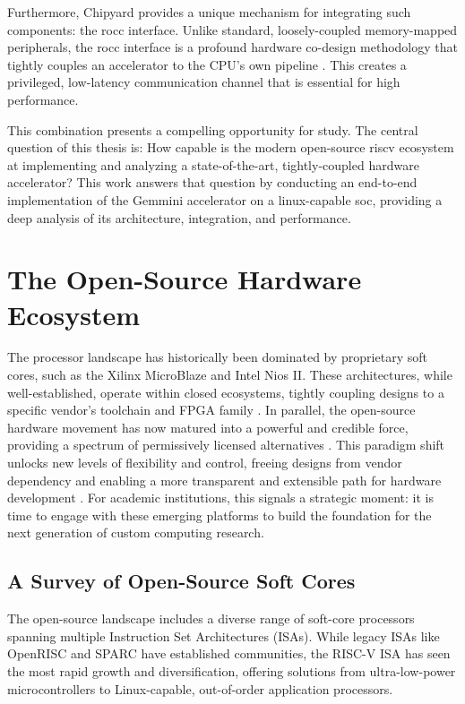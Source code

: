 Furthermore, Chipyard provides a unique mechanism for integrating such components: the \acrfull{rocc} interface. Unlike standard, loosely-coupled memory-mapped peripherals, the \acrshort{rocc} interface is a profound hardware co-design methodology that tightly couples an accelerator to the CPU's own pipeline \cite{pala_master_thesis}. This creates a privileged, low-latency communication channel that is essential for high performance.

This combination presents a compelling opportunity for study. The central question of this thesis is: How capable is the modern open-source \acrshort{riscv} ecosystem at implementing and analyzing a state-of-the-art, tightly-coupled hardware accelerator? This work answers that question by conducting an end-to-end implementation of the Gemmini accelerator on a \acrshort{linux}-capable \acrshort{soc}, providing a deep analysis of its architecture, integration, and performance.

\section{The Open-Source Hardware Ecosystem}

The processor landscape has historically been dominated by proprietary soft cores, such as the Xilinx MicroBlaze and Intel Nios II. These architectures, while well-established, operate within closed ecosystems, tightly coupling designs to a specific vendor's toolchain and FPGA family \cite{intel_licensing_cores, xilinx_microblaze_faq}. In parallel, the open-source hardware movement has now matured into a powerful and credible force, providing a spectrum of permissively licensed alternatives \cite{tarassov_vivado-risc-v}. This paradigm shift unlocks new levels of flexibility and control, freeing designs from vendor dependency and enabling a more transparent and extensible path for hardware development \cite{gaisler_silicon_ip_licensing}. For academic institutions, this signals a strategic moment: it is time to engage with these emerging platforms to build the foundation for the next generation of custom computing research.

\subsection{A Survey of Open-Source Soft Cores}

The open-source landscape includes a diverse range of soft-core processors spanning multiple Instruction Set Architectures (ISAs). While legacy ISAs like OpenRISC and SPARC have established communities, the RISC-V ISA has seen the most rapid growth and diversification, offering solutions from ultra-low-power microcontrollers to Linux-capable, out-of-order application processors.

